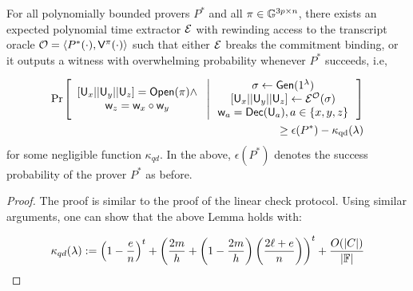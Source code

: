 

\begin{lemma}[Soundness]\label{lem:quadcheck_sound}
For all polynomially bounded provers $P^\ast$ and all $\pi\in \mathbb{G}^{3p\times n}$,
there exists an expected polynomial time extractor $\mathcal{E}$ with rewinding access
to the transcript oracle $\mathcal{O}=\langle P^\ast(\cdot),\mathsf{V}^{\pi}(\cdot)\rangle$
such that either $\mathcal{E}$ breaks the commitment binding, or it outputs a witness
with overwhelming probability whenever $P^\ast$ succeeds, i.e,

{\footnotesize
\begin{align*}
\condprob{
\begin{array}{c}
{[}\ewit_x||\ewit_y||\ewit_z{]}=\open(\pi)\wedge \\
\wit_z=\wit_x\circ\wit_y
\end{array}
}{
\begin{array}{c}
\sigma %
\leftarrow \gen(\secparam) \\
{[}\ewit_x||\ewit_y||\ewit_z{]}%
\leftarrow \extr^{\mc{O}}(\sigma) \\ 
\wit_a=\dec(\ewit_a), a\in \{x,y,z\}
\end{array}
}\\
\geq \epsilon(P^\ast) - \kappa_{\rm qd}(\secpar)
\end{align*}
}
for some negligible function $\kappa_{qd}$. In the above, $\epsilon(P^\ast)$
denotes the success probability of the prover $P^\ast$ as before.
\end{lemma}
\begin{proof}
The proof is similar to the proof of the linear check protocol. Using similar
arguments, one can show that the above Lemma holds with:

{\footnotesize
\begin{equation*}
\kappa_{qd}(\lambda) := \left(1-\frac{e}{n}\right)^t +
\left(\frac{2m}{h}+\left(1-\frac{2m}{h}\right)\left(\frac{2\ell+e}{n}\right)\right)^t
+ \frac{O(|C|)}{|\mathbb{F}|}
\end{equation*}
}
\end{proof}

